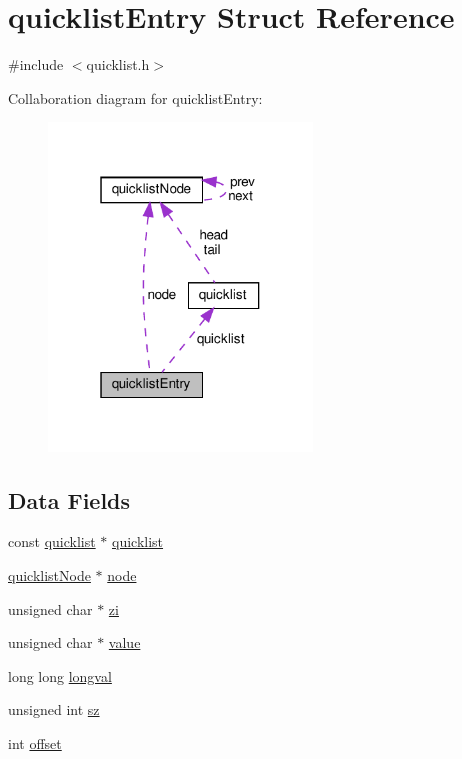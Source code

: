 \hypertarget{structquicklist_entry}{}\section{quicklist\+Entry Struct Reference}
\label{structquicklist_entry}


{\ttfamily \#include $<$quicklist.\+h$>$}



Collaboration diagram for quicklist\+Entry\+:
\nopagebreak
\begin{figure}[H]
\begin{center}
\leavevmode
\includegraphics[width=199pt]{structquicklist_entry__coll__graph}
\end{center}
\end{figure}
\subsection*{Data Fields}
\begin{DoxyCompactItemize}
\item 
const \hyperlink{structquicklist}{quicklist} $\ast$ \hyperlink{structquicklist_entry_a4aa33c2ba0681808fcf026725cfac512}{quicklist}
\item 
\hyperlink{structquicklist_node}{quicklist\+Node} $\ast$ \hyperlink{structquicklist_entry_a78fcac69a40608d499c1efd0fe66593a}{node}
\item 
unsigned char $\ast$ \hyperlink{structquicklist_entry_a14218c4c1ee05ec32cc12721f772f294}{zi}
\item 
unsigned char $\ast$ \hyperlink{structquicklist_entry_a2f3bdb9d405cf00d02949b9141ce1396}{value}
\item 
long long \hyperlink{structquicklist_entry_abf0b4c9cc55c75787c954aa8f383cdd9}{longval}
\item 
unsigned int \hyperlink{structquicklist_entry_a2c1bd10d4bbc82d2d6c052c5842c0c8c}{sz}
\item 
int \hyperlink{structquicklist_entry_aed7ea92f45bd273dde380a45ddced592}{offset}
\end{DoxyCompactItemize}


